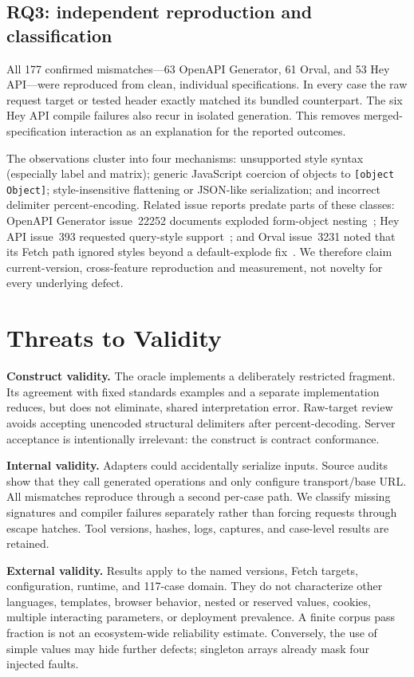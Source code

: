 \documentclass[runningheads]{llncs}
\begin{document}
\subsection{RQ3: independent reproduction and classification}

All 177 confirmed mismatches---63 OpenAPI Generator, 61 Orval, and 53 Hey API---were reproduced from clean, individual specifications. In every case the raw request target or tested header exactly matched its bundled counterpart. The six Hey API compile failures also recur in isolated generation. This removes merged-specification interaction as an explanation for the reported outcomes.

The observations cluster into four mechanisms: unsupported style syntax (especially label and matrix); generic JavaScript coercion of objects to \texttt{[object Object]}; style-insensitive flattening or JSON-like serialization; and incorrect delimiter percent-encoding. Related issue reports predate parts of these classes: OpenAPI Generator issue~22252 documents exploded form-object nesting~\cite{genissue}; Hey API issue~393 requested query-style support~\cite{heyissue}; and Orval issue~3231 noted that its Fetch path ignored styles beyond a default-explode fix~\cite{orvalissue}. We therefore claim current-version, cross-feature reproduction and measurement, not novelty for every underlying defect.

\section{Threats to Validity}

\textbf{Construct validity.} The oracle implements a deliberately restricted fragment. Its agreement with fixed standards examples and a separate implementation reduces, but does not eliminate, shared interpretation error. Raw-target review avoids accepting unencoded structural delimiters after percent-decoding. Server acceptance is intentionally irrelevant: the construct is contract conformance.

\textbf{Internal validity.} Adapters could accidentally serialize inputs. Source audits show that they call generated operations and only configure transport/base URL. All mismatches reproduce through a second per-case path. We classify missing signatures and compiler failures separately rather than forcing requests through escape hatches. Tool versions, hashes, logs, captures, and case-level results are retained.

\textbf{External validity.} Results apply to the named versions, Fetch targets, configuration, runtime, and 117-case domain. They do not characterize other languages, templates, browser behavior, nested or reserved values, cookies, multiple interacting parameters, or deployment prevalence. A finite corpus pass fraction is not an ecosystem-wide reliability estimate. Conversely, the use of simple values may hide further defects; singleton arrays already mask four injected faults.
\end{document}
